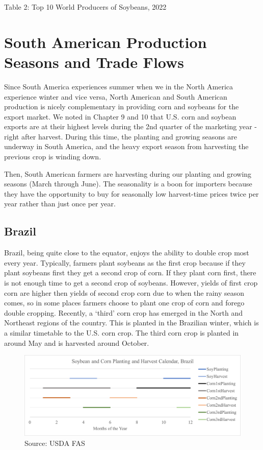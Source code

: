 \documentclass[
  letterpaper,
  DIV=11,
  numbers=noendperiod]{scrreprt}
\begin{document}
Table 2: Top 10 World Producers of Soybeans, 2022

\hypertarget{south-american-production-seasons-and-trade-flows}{%
\section{South American Production Seasons and Trade
Flows}\label{south-american-production-seasons-and-trade-flows}}

Since South America experiences summer when we in the North America
experience winter and vice versa, North American and South American
production is nicely complementary in providing corn and soybeans for
the export market. We noted in Chapter 9 and 10 that U.S. corn and
soybean exports are at their highest levels during the 2nd quarter of
the marketing year - right after harvest. During this time, the planting
and growing seasons are underway in South America, and the heavy export
season from harvesting the previous crop is winding down.

Then, South American farmers are harvesting during our planting and
growing seasons (March through June). The seasonality is a boon for
importers because they have the opportunity to buy for seasonally low
harvest-time prices twice per year rather than just once per year.

\hypertarget{brazil}{%
\subsection{Brazil}\label{brazil}}

Brazil, being quite close to the equator, enjoys the ability to double
crop most every year. Typically, farmers plant soybeans as the first
crop because if they plant soybeans first they get a second crop of
corn. If they plant corn first, there is not enough time to get a second
crop of soybeans. However, yields of first crop corn are higher then
yields of second crop corn due to when the rainy season comes, so in
some places farmers choose to plant one crop of corn and forego double
cropping. Recently, a `third' corn crop has emerged in the North and
Northeast regions of the country. This is planted in the Brazilian
winter, which is a similar timetable to the U.S. corn crop. The third
corn crop is planted in around May and is harvested around October.

\begin{figure}

{\centering \includegraphics{assets/Brazilcalendar.png}

}

\caption{Source: USDA FAS}

\end{figure}
\end{document}
